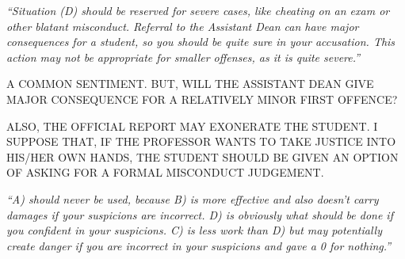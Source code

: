 \documentclass[portrait,11pt]{seminar}
\begin{document}
\bs

{\it ``Situation (D) should be reserved for severe cases, like cheating on an exam or other blatant misconduct. Referral to the Assistant Dean can have major consequences for a student, so you should be quite sure in your accusation. This action may not be appropriate for smaller offenses, as it is quite severe.''}

\medskip

A COMMON SENTIMENT. BUT, WILL THE ASSISTANT DEAN GIVE MAJOR CONSEQUENCE FOR A RELATIVELY MINOR FIRST OFFENCE? 

\medskip

ALSO, THE OFFICIAL REPORT MAY EXONERATE THE STUDENT. I SUPPOSE THAT, IF THE PROFESSOR WANTS TO TAKE JUSTICE INTO HIS/HER OWN HANDS, THE STUDENT SHOULD BE GIVEN AN OPTION OF ASKING FOR A FORMAL MISCONDUCT JUDGEMENT.

\es

\bs

{\it ``A) should never be used, because B) is more effective and also doesn’t carry damages if your suspicions are incorrect. D) is obviously what should be done if you confident in your suspicions. C) is less work than D) but may potentially create danger if you are incorrect in your suspicions and gave a 0 for nothing.''}

\es

\bs
\it








\es


\end{document}
